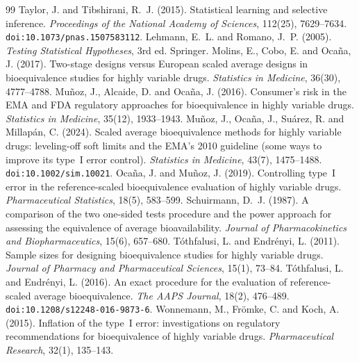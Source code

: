 \documentclass[11pt]{article}
\theoremstyle{remark}
\begin{document}
\begin{thebibliography}{99}
 Taylor, J. and Tibshirani, R.~J. (2015). Statistical learning and selective inference. \emph{Proceedings of the National Academy of Sciences}, 112(25), 7629--7634. \texttt{doi:10.1073/pnas.1507583112}.
 Lehmann, E.~L. and Romano, J.~P. (2005). \emph{Testing Statistical Hypotheses}, 3rd ed. Springer.
 Molins, E., Cobo, E. and Oca\~na, J. (2017). Two-stage designs versus European scaled average designs in bioequivalence studies for highly variable drugs. \emph{Statistics in Medicine}, 36(30), 4777--4788.
 Mu\~noz, J., Alcaide, D. and Oca\~na, J. (2016). Consumer's risk in the EMA and FDA regulatory approaches for bioequivalence in highly variable drugs. \emph{Statistics in Medicine}, 35(12), 1933--1943.
 Mu\~noz, J., Oca\~na, J., Su\'arez, R. and Millap\'an, C. (2024). Scaled average bioequivalence methods for highly variable drugs: leveling-off soft limits and the EMA's 2010 guideline (some ways to improve its type~I error control). \emph{Statistics in Medicine}, 43(7), 1475--1488. \texttt{doi:10.1002/sim.10021}.
 Oca\~na, J. and Mu\~noz, J. (2019). Controlling type~I error in the reference-scaled bioequivalence evaluation of highly variable drugs. \emph{Pharmaceutical Statistics}, 18(5), 583--599.
 Schuirmann, D.~J. (1987). A comparison of the two one-sided tests procedure and the power approach for assessing the equivalence of average bioavailability. \emph{Journal of Pharmacokinetics and Biopharmaceutics}, 15(6), 657--680.
 T\'othfalusi, L. and Endr\'enyi, L. (2011). Sample sizes for designing bioequivalence studies for highly variable drugs. \emph{Journal of Pharmacy and Pharmaceutical Sciences}, 15(1), 73--84.
 T\'othfalusi, L. and Endr\'enyi, L. (2016). An exact procedure for the evaluation of reference-scaled average bioequivalence. \emph{The AAPS Journal}, 18(2), 476--489. \texttt{doi:10.1208/s12248-016-9873-6}.
 Wonnemann, M., Fr\"omke, C. and Koch, A. (2015). Inflation of the type~I error: investigations on regulatory recommendations for bioequivalence of highly variable drugs. \emph{Pharmaceutical Research}, 32(1), 135--143.
\end{thebibliography}
\end{document}
